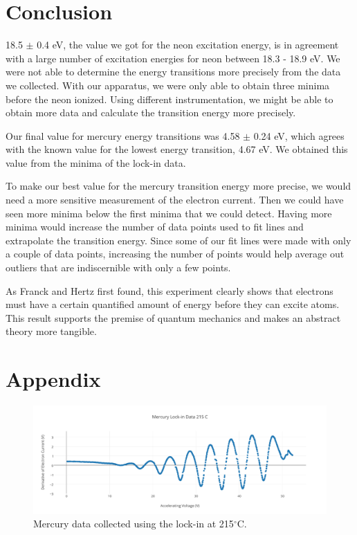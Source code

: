 \documentclass[prb,preprint]{revtex4-1}
\begin{document}
\section{Conclusion}

18.5 $\pm$ 0.4 eV, the value we got for the neon excitation energy, is in agreement with a large number of excitation energies for neon between 18.3 - 18.9 eV. We were not able to determine the energy transitions more precisely from the data we collected. With our apparatus, we were only able to obtain three minima before the neon ionized. Using different instrumentation, we might be able to obtain more data and calculate the transition energy more precisely.

Our final value for mercury energy transitions was 4.58 $\pm$ 0.24 eV, which agrees with the known value for the lowest energy transition, 4.67 eV. We obtained this value from the minima of the lock-in data. 

To make our best value for the mercury transition energy more precise, we would need a more sensitive measurement of the electron current. Then we could have seen more minima below the first minima that we could detect. Having more minima would increase the number of data points used to fit lines and extrapolate the transition energy. Since some of our fit lines were made with only a couple of data points, increasing the number of points would help average out outliers that are indiscernible with only a few points.

As Franck and Hertz first found, this experiment clearly shows that electrons must have a certain quantified amount of energy before they can excite atoms. This result supports the premise of quantum mechanics and makes an abstract theory more tangible.

\section{Appendix}

\begin{figure}[h!]
\centering

\includegraphics[width=6in]{lockin_215.pdf}
\caption{Mercury data collected using the lock-in at 215$^{\circ}$C.}

\label{lockin_215}
\end{figure}
\end{document}
